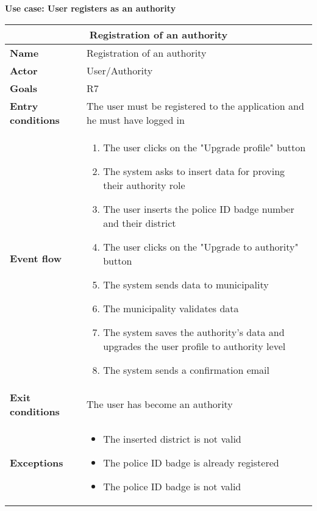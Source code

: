 \begin{description}
    \item \textbf{Use case: User registers as an authority}
    \begin{center}
        \begin{tabular}{|p{3cm}|p{7cm}|}
            \multicolumn{2}{c}{\textbf{Registration of an authority}} \\
            \hline
            \textbf{Name} & Registration of an authority \\
            \hline
            \textbf{Actor} & User/Authority \\
            \hline
            \textbf{Goals} & R7 \\
            \hline
            \textbf{Entry conditions} & The user must be registered to the application and he must have logged in \\
            \hline
            \textbf{Event flow} &
            \begin{enumerate}
                \item The user clicks on the "Upgrade profile" button
                \item The system asks to insert data for proving their authority role 
                \item The user inserts the police ID badge number and their district 
                \item The user clicks on the "Upgrade to authority" button
                \item The system sends data to municipality
                \item The municipality validates data 
                \item The system saves the authority's data and upgrades the user profile to authority level 
                \item The system sends a confirmation email
            \end{enumerate} \\
            \hline
            \textbf{Exit conditions} & The user has become an authority \\
            \hline
            \textbf{Exceptions}
            & \begin{itemize}
                \item The inserted district is not valid
                \item The police ID badge is already registered             
                \item The police ID badge is not valid
            \end{itemize} \\
            \hline
        \end{tabular}
    \end{center}
\end{description}

